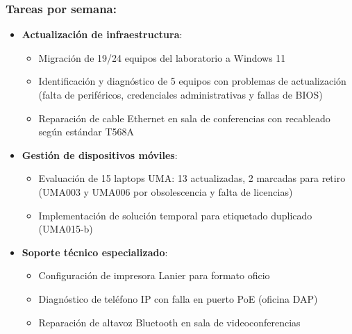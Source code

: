 \subsubsection{Tareas por semana:}
\begin{itemize}
	\item \textbf{Actualización de infraestructura}:
	\begin{itemize}
		\item Migración de 19/24 equipos del laboratorio a Windows 11
		\item Identificación y diagnóstico de 5 equipos con problemas de actualización (falta de periféricos, credenciales administrativas y fallas de BIOS)
		\item Reparación de cable Ethernet en sala de conferencias con recableado según estándar T568A
	\end{itemize}
	
	\item \textbf{Gestión de dispositivos móviles}:
	\begin{itemize}
		\item Evaluación de 15 laptops UMA: 13 actualizadas, 2 marcadas para retiro (UMA003 y UMA006 por obsolescencia y falta de licencias)
		\item Implementación de solución temporal para etiquetado duplicado (UMA015-b)
	\end{itemize}
	
	\item \textbf{Soporte técnico especializado}:
	\begin{itemize}
		\item Configuración de impresora Lanier para formato oficio
		\item Diagnóstico de teléfono IP con falla en puerto PoE (oficina DAP)
		\item Reparación de altavoz Bluetooth en sala de videoconferencias
	\end{itemize}
\end{itemize}

